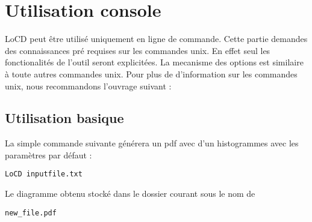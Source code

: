 \chapter{Utilisation console}
 
LoCD peut être utilisé uniquement en ligne de commande. Cette partie demandes des connaissances pré requises sur les commandes unix. En effet seul les fonctionalités de l'outil seront explicitées. La mecanisme des options est similaire à toute autres commandes unix. Pour plus de d'information sur les commandes unix, nous recommandons l'ouvrage suivant : \cite{linux}
\section{Utilisation basique}
La simple commande suivante générera un pdf avec d'un histogrammes avec les paramètres par défaut : %
\begin{lstlisting}
LoCD inputfile.txt
\end{lstlisting}
Le diagramme obtenu stocké dans le dossier courant sous le nom de
\begin{lstlisting} 
new_file.pdf
\end{lstlisting}
